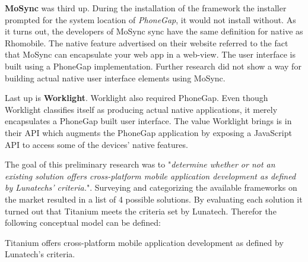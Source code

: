 {\bf MoSync} was third up. During the installation of the framework the installer prompted for the system location of \emph{PhoneGap}, it would not install without. As it turns out, the developers of MoSync sync have the same definition for native as Rhomobile. The native feature advertised on their website referred to the fact that MoSync can encapsulate your web app in a web-view. The user interface is built using a PhoneGap implementation. Further research did not show a way for building actual native user interface elements using MoSync.

Last up is {\bf Worklight}. Worklight also required PhoneGap. Even though Worklight classifies itself as producing actual native applications, it merely encapsulates a PhoneGap built user interface. The value Worklight brings is in their API which augments the PhoneGap application by exposing a JavaScript API to access some of the devices' native features.


The goal of this preliminary research was to "\emph{determine whether or not an existing solution offers cross-platform mobile application development as defined by Lunatechs' criteria.}".  Surveying and categorizing the available frameworks on the market resulted in a list of 4 possible solutions. By evaluating each solution it turned out that Titanium meets the criteria set by Lunatech. Therefor the following conceptual model can be defined:
\begin{shadequote}
Titanium offers cross-platform mobile application development as defined by Lunatech's criteria.%
\end{shadequote}